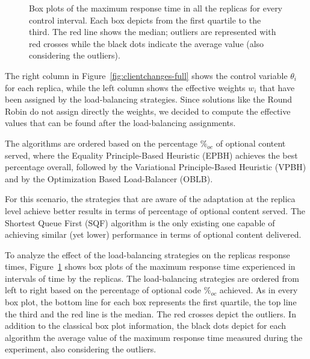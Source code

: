 \begin{figure}
\centering 
  \vspace{-4mm}
\caption{Box plots of the maximum response time in all the replicas
  for every control interval. Each box depicts from the first quartile
  to the third. The red line shows the median; outliers are
  represented with red crosses while the black dots indicate the
  average value (also considering the outliers).}
  \vspace{-2mm}
\label{fig:clientchanges-boxplot}
\end{figure}

The right column in Figure~\ref{fig:clientchanges-full} shows the
control variable $\theta_i$ for each replica, while the left column
shows the effective weights $w_i$ that have been assigned by the
load-balancing strategies. Since solutions like the Round Robin do not
assign directly the weights, we decided to compute the effective
values that can be found after the load-balancing assignments. 

The algorithms are ordered based on the percentage $\%_{oc}$ of optional
content served, where the Equality Principle-Based Heuristic (EPBH)
achieves the best percentage overall, followed by the Variational
Principle-Based Heuristic (VPBH) and by the Optimization Based
Load-Balancer (OBLB).

For this scenario, the strategies that are aware of the adaptation at
the replica level achieve better results in terms of percentage of
optional content served. The Shortest Queue First (SQF) algorithm is
the only existing one capable of achieving similar (yet lower)
performance in terms of optional content delivered.

To analyze the effect of the load-balancing strategies on the replicas
response times, Figure~\ref{fig:clientchanges-boxplot} shows box plots
of the maximum response time experienced in intervals of time by the
replicas. The load-balancing strategies are ordered from left to right
based on the percentage of optional code $\%_{oc}$ achieved. As in
every box plot, the bottom line for each box represents the first
quartile, the top line the third and the red line is the median. The
red crosses depict the outliers. In addition to the classical box plot
information, the black dots depict for each algorithm the average
value of the maximum response time measured during the experiment, also
considering the outliers.

